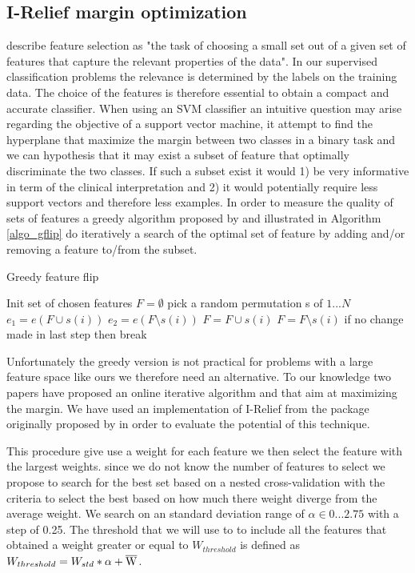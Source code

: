 \documentclass[12pt,journal,compsoc]{IEEEtran}
\begin{document}
\subsection{I-Relief margin optimization}
\cite{Gilad-bachrach2004} describe feature selection as "the task of choosing a small set out of a given set of features that capture the relevant properties of the data". In our supervised classification problems the relevance is determined by the labels on the training data. The choice of the features is therefore essential to obtain a compact and accurate classifier. When using an SVM classifier an intuitive question may arise regarding the objective of a support vector machine,  it attempt to find the hyperplane that maximize the margin between two classes in a binary task and we can hypothesis that it may exist a subset of feature that optimally discriminate the two classes. If such a subset exist it would 1) be very informative in term of the clinical interpretation and 2) it would potentially require less support vectors and therefore less examples. In order to measure the quality of sets of features a greedy algorithm proposed by \cite{Gilad-bachrach2004} and illustrated in Algorithm \ref{algo_gflip} do iteratively a search of the optimal set of feature by adding and/or removing a feature to/from the subset.

\begin{algorithm}
\caption{Greedy feature flip}
\begin{algorithmic} 
\STATE Init set of chosen features $F = \emptyset$
\STATE pick a random permutation s of ${1...N}$
\STATE $e_{1}=e(F\cup{s(i)})$
\STATE $e_{2}=e(F\setminus{s(i)})$
\STATE $F=F\cup{s(i)}$
\ELSE
\STATE $F=F\setminus{s(i)}$
\ENDIF
\ENDFOR
\STATE if no change made in last step then break
\ENDFOR
\end{algorithmic}
\label{algo_gflip}
\end{algorithm}

Unfortunately the greedy version is not practical for problems with a large feature space like ours we therefore need an alternative. To our knowledge two papers have proposed an online iterative algorithm \cite{Gilad-bachrach2004} and \cite{Sun2007} that aim at maximizing the margin. We have used an implementation of I-Relief from the package \cite{Hanke2009} originally proposed by \cite{Sun2007} in order to evaluate the potential of this technique.

This procedure give use a weight for each feature we then select the feature with the largest weights. since we do not know the number of features to select we propose to search for the best set based on a nested cross-validation with the criteria to select the best based on how much there weight diverge from the average weight. We search on an standard deviation range of $\alpha\in{0...2.75}$ with a step of 0.25. The threshold that we will use to to include all the features that obtained a weight greater or equal to $W_{threshold}$ is defined as $W_{threshold} = W_{std}*\alpha+\overline{\rm W}$.
\end{document}
